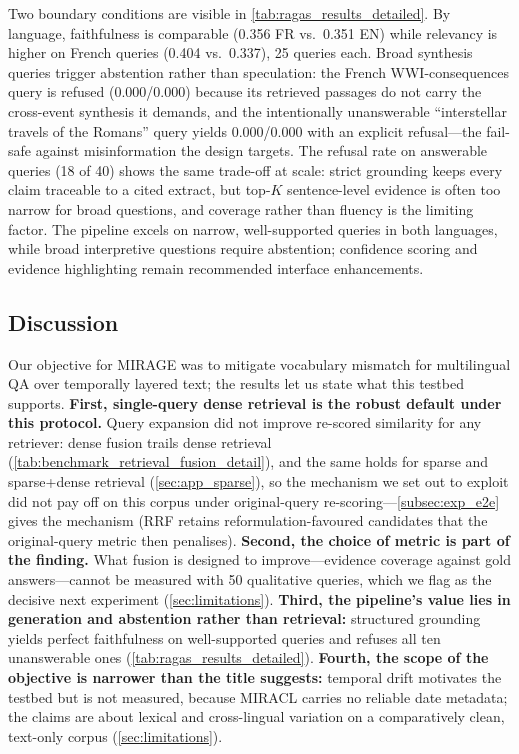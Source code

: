 \documentclass[11pt]{article}
\begin{document}
Two boundary conditions are visible in \cref{tab:ragas_results_detailed}. By language, faithfulness is comparable (0.356 FR vs.\ 0.351 EN) while relevancy is higher on French queries (0.404 vs.\ 0.337), 25 queries each. Broad synthesis queries trigger abstention rather than speculation: the French WWI-consequences query is refused (0.000/0.000) because its retrieved passages do not carry the cross-event synthesis it demands, and the intentionally unanswerable ``interstellar travels of the Romans'' query yields 0.000/0.000 with an explicit refusal---the fail-safe against misinformation the design targets. The refusal rate on answerable queries (18 of 40) shows the same trade-off at scale: strict grounding keeps every claim traceable to a cited extract, but top-\(K\) sentence-level evidence is often too narrow for broad questions, and coverage rather than fluency is the limiting factor. The pipeline excels on narrow, well-supported queries in both languages, while broad interpretive questions require abstention; confidence scoring and evidence highlighting remain recommended interface enhancements.

\subsection{Discussion}
\label{subsec:discussion}

Our objective for MIRAGE was to mitigate vocabulary mismatch for multilingual QA over temporally layered text; the results let us state what this testbed supports. \textbf{First, single-query dense retrieval is the robust default under this protocol.} Query expansion did not improve re-scored similarity for any retriever: dense fusion trails dense retrieval (\cref{tab:benchmark_retrieval_fusion_detail}), and the same holds for sparse and sparse+dense retrieval (\cref{sec:app_sparse}), so the mechanism we set out to exploit did not pay off on this corpus under original-query re-scoring---\cref{subsec:exp_e2e} gives the mechanism (RRF retains reformulation-favoured candidates that the original-query metric then penalises). \textbf{Second, the choice of metric is part of the finding.} What fusion is designed to improve---evidence coverage against gold answers---cannot be measured with 50 qualitative queries, which we flag as the decisive next experiment (\cref{sec:limitations}). \textbf{Third, the pipeline's value lies in generation and abstention rather than retrieval:} structured grounding yields perfect faithfulness on well-supported queries and refuses all ten unanswerable ones (\cref{tab:ragas_results_detailed}). \textbf{Fourth, the scope of the objective is narrower than the title suggests:} temporal drift motivates the testbed but is not measured, because MIRACL carries no reliable date metadata; the claims are about lexical and cross-lingual variation on a comparatively clean, text-only corpus (\cref{sec:limitations}).
\end{document}
